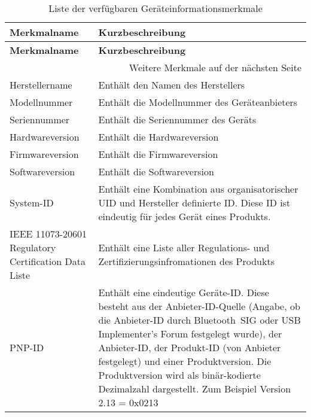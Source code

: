 \begin{longtable}[c]{|p{4cm}|p{11cm}|}
    \caption{Liste der verfügbaren Geräteinformationsmerkmale}
    \label{table:deviceinformationlist}\\
    \hline
    \textbf{Merkmalname} & \textbf{Kurzbeschreibung}\\
    \hline
    \hline
    \endfirsthead

    \hline
    \textbf{Merkmalname} & \textbf{Kurzbeschreibung}\\
    \hline
    \hline
    \endhead

    \hline
    \multicolumn{2}{|r|}{Weitere Merkmale auf der nächsten Seite}\\
    \hline
    \endfoot

    \hline
    \endlastfoot
    
    Herstellername & Enthält den Namen des Herstellers \cite[S.~8]{bluetoothDeviceI}\\
    \hline
    Modellnummer & Enthält die Modellnummer des Geräteanbieters \cite[S.~8]{bluetoothDeviceI}\\
    \hline
    Seriennummer & Enthält die Seriennummer des Geräts \cite[S.~8]{bluetoothDeviceI}\\
    \hline
    Hardwareversion & Enthält die Hardwareversion \cite[S.~9]{bluetoothDeviceI}\\
    \hline
    Firmwareversion & Enthält die Firmwareversion \cite[S.~9]{bluetoothDeviceI}\\
    \hline
    Softwareversion & Enthält die Softwareversion \cite[S.~9]{bluetoothDeviceI}\\
    \hline
    System-ID & Enthält eine Kombination aus organisatorischer UID und Hersteller definierte ID. Diese ID ist eindeutig für jedes Gerät eines Produkts. \cite[S.~9]{bluetoothDeviceI}\\
    \hline
    IEEE 11073-20601 Regulatory Certification Data Liste & Enthält eine Liste aller Regulations- und Zertifizierungsinfromationen des Produkts \cite[S.~9]{bluetoothDeviceI}\\
    \hline
    PNP-ID & Enthält eine eindeutige Geräte-ID. Diese besteht aus der Anbieter-ID-Quelle (Angabe, ob die Anbieter-ID durch Bluetooth~SIG oder USB Implementer's Forum festgelegt wurde), der Anbieter-ID, der Produkt-ID (von Anbieter festgelegt) und einer Produktversion. Die Produktversion wird als binär-kodierte Dezimalzahl dargestellt. Zum Beispiel Version 2.13 = 0x0213 \cite[S.~10f.]{bluetoothDeviceI}\\
\end{longtable}

